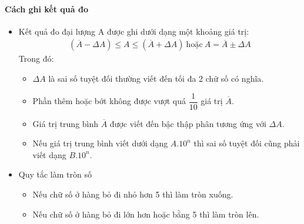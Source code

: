 \paragraph{Cách ghi kết quả đo}
\begin{itemize}
\item Kết quả đo đại lượng A được ghi dưới dạng một khoảng giá trị:
\begin{align*}
\left(\overline{A}-\Delta A\right)\leq A \leq \left(\overline{A}+\Delta A\right)\ \text{hoặc}\ A=\overline{A}\pm \Delta A
\end{align*}
Trong đó:
\begin{itemize}
\item[+] $\Delta A$ là sai số tuyệt đối thường viết đến tối đa 2 chữ số có nghĩa.
\item[+] Phần thêm hoặc bớt không được vượt quá $ \dfrac{1}{10} $ giá trị $\overline{A}$.
\item[+] Giá trị trung bình $\overline{A}$ được viết đến bậc thập phân tương ứng với $\Delta A$.
\item[+] Nếu giá trị trung bình viết dưới dạng $ A.10^n $ thì sai số tuyệt đối cũng phải viết dạng $ B.10^n $.
\end{itemize}
\item Quy tắc làm tròn số
\begin{itemize}
\item[+] Nếu chữ số ở hàng bỏ đi nhỏ hơn 5 thì làm tròn xuống.
\item[+] Nếu chữ số ở hàng bỏ đi lớn hơn hoặc bằng 5 thì làm tròn lên. 
\end{itemize}
\end{itemize}
